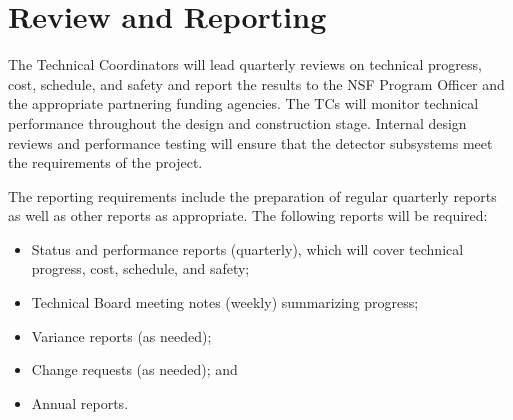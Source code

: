 \section{Review and Reporting}


The Technical Coordinators will lead quarterly reviews on technical progress, cost, schedule, and safety and report the results to the NSF Program Officer and the appropriate partnering funding agencies. The TCs will monitor technical performance throughout the design and construction stage. Internal design reviews and performance testing will ensure that the detector subsystems meet the requirements of the project.

The reporting requirements include the preparation of regular quarterly reports as well as other reports as appropriate. The following reports will be required:
\begin{itemize}
\item Status and performance reports (quarterly), which will cover technical progress, cost, schedule, and safety;
\item Technical Board meeting notes (weekly) summarizing progress;
\item Variance reports (as needed);
\item Change requests (as needed); and
\item Annual reports.
\end{itemize}